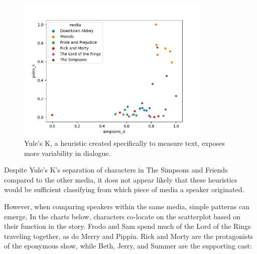 \documentclass{article}
\newcommand{\largeimagewidth}{350}
\begin{document}
\begin{titlepage}
\begin{figure}[H]
\centering
\includegraphics[width=\largeimagewidth]{images/heuristics.png}
\caption{Yule's K, a heuristic created specifically to measure text, exposes more variability in dialogue.}
\end{figure}

Despite Yule's K's separation of characters in The Simpsons and Friends compared to the other media, it does not appear likely that these heuristics would be sufficient classifying from which piece of media a speaker originated.

However, when comparing speakers within the same media, simple patterns can emerge. In the charts below, characters co-locate on the scatterplot based on their function in the story. Frodo and Sam spend much of the Lord of the Rings traveling together, as do Merry and Pippin. Rick and Morty are the protagonists of the eponymous show, while Beth, Jerry, and Summer are the supporting cast:


\end{titlepage}
\end{document}
